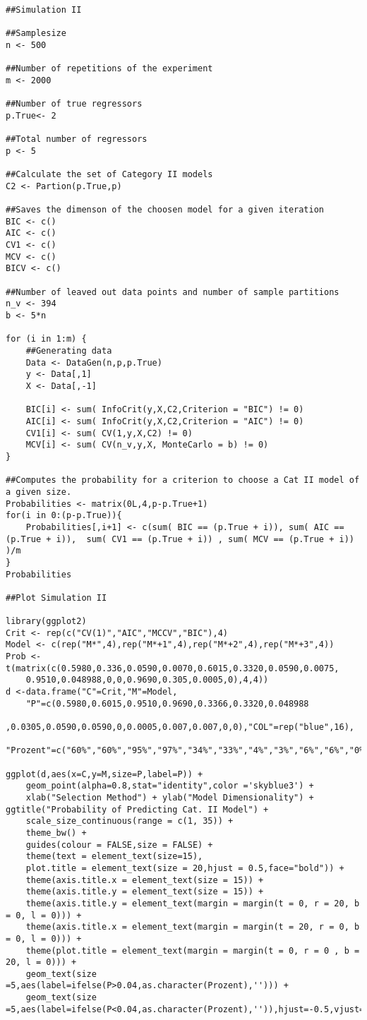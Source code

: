 \documentclass[Research_Module_ES.tex]{subfiles}
\begin{document}
\begin{lstlisting}[title={Simulation II}]
##Simulation II 

##Samplesize
n <- 500

##Number of repetitions of the experiment
m <- 2000

##Number of true regressors 
p.True<- 2

##Total number of regressors
p <- 5

##Calculate the set of Category II models
C2 <- Partion(p.True,p)

##Saves the dimenson of the choosen model for a given iteration
BIC <- c()
AIC <- c()
CV1 <- c()
MCV <- c()
BICV <- c()

##Number of leaved out data points and number of sample partitions
n_v <- 394
b <- 5*n

for (i in 1:m) {
	##Generating data
	Data <- DataGen(n,p,p.True)
	y <- Data[,1]
	X <- Data[,-1]

	BIC[i] <- sum( InfoCrit(y,X,C2,Criterion = "BIC") != 0)
	AIC[i] <- sum( InfoCrit(y,X,C2,Criterion = "AIC") != 0)
	CV1[i] <- sum( CV(1,y,X,C2) != 0)
	MCV[i] <- sum( CV(n_v,y,X, MonteCarlo = b) != 0)
}

##Computes the probability for a criterion to choose a Cat II model of a given size.
Probabilities <- matrix(0L,4,p-p.True+1)
for(i in 0:(p-p.True)){
	Probabilities[,i+1] <- c(sum( BIC == (p.True + i)), sum( AIC == (p.True + i)),  sum( CV1 == (p.True + i)) , sum( MCV == (p.True + i)) )/m
}
Probabilities

##Plot Simulation II

library(ggplot2)
Crit <- rep(c("CV(1)","AIC","MCCV","BIC"),4)
Model <- c(rep("M*",4),rep("M*+1",4),rep("M*+2",4),rep("M*+3",4))
Prob <- t(matrix(c(0.5980,0.336,0.0590,0.0070,0.6015,0.3320,0.0590,0.0075,
	0.9510,0.048988,0,0,0.9690,0.305,0.0005,0),4,4))
d <-data.frame("C"=Crit,"M"=Model,
	"P"=c(0.5980,0.6015,0.9510,0.9690,0.3366,0.3320,0.048988
	,0.0305,0.0590,0.0590,0,0.0005,0.007,0.007,0,0),"COL"=rep("blue",16),
	"Prozent"=c("60%","60%","95%","97%","34%","33%","4%","3%","6%","6%","0%","0%","0.7%","0.8%","0%","0%"))

ggplot(d,aes(x=C,y=M,size=P,label=P)) +
	geom_point(alpha=0.8,stat="identity",color ='skyblue3') +
	xlab("Selection Method") + ylab("Model Dimensionality") + ggtitle("Probability of Predicting Cat. II Model") +
	scale_size_continuous(range = c(1, 35)) +
	theme_bw() +
	guides(colour = FALSE,size = FALSE) +
	theme(text = element_text(size=15),
	plot.title = element_text(size = 20,hjust = 0.5,face="bold")) +
	theme(axis.title.x = element_text(size = 15)) +
	theme(axis.title.y = element_text(size = 15)) +
	theme(axis.title.y = element_text(margin = margin(t = 0, r = 20, b = 0, l = 0))) +
	theme(axis.title.x = element_text(margin = margin(t = 20, r = 0, b = 0, l = 0))) +
	theme(plot.title = element_text(margin = margin(t = 0, r = 0 , b = 20, l = 0))) +
	geom_text(size =5,aes(label=ifelse(P>0.04,as.character(Prozent),''))) +
	geom_text(size =5,aes(label=ifelse(P<0.04,as.character(Prozent),'')),hjust=-0.5,vjust=0.5)

\end{lstlisting}
\end{document}
